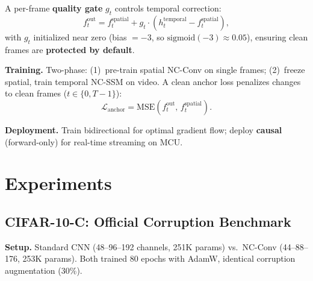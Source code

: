 \documentclass[runningheads]{llncs}
\begin{document}
A per-frame \textbf{quality gate} $g_t$ controls temporal correction:
\begin{equation}
f_t^{\text{out}} = f_t^{\text{spatial}} + g_t \cdot (h_t^{\text{temporal}} - f_t^{\text{spatial}}),
\end{equation}
with $g_t$ initialized near zero (bias $= -3$, so $\text{sigmoid}(-3) \approx 0.05$), ensuring clean frames are \textbf{protected by default}.

\noindent\textbf{Training.}
Two-phase: (1)~pre-train spatial NC-Conv on single frames; (2)~freeze spatial, train temporal NC-SSM on video.
A clean anchor loss penalizes changes to clean frames ($t \in \{0, T{-}1\}$):
\begin{equation}
\mathcal{L}_{\text{anchor}} = \text{MSE}(f_t^{\text{out}},\, f_t^{\text{spatial}}).
\end{equation}

\noindent\textbf{Deployment.}
Train bidirectional for optimal gradient flow; deploy \textbf{causal} (forward-only) for real-time streaming on MCU.


\section{Experiments}
\label{sec:experiments}

\subsection{CIFAR-10-C: Official Corruption Benchmark}
\label{sec:cifar10c}

\noindent\textbf{Setup.}
Standard CNN (48--96--192 channels, 251K params) vs.\ NC-Conv (44--88--176, 253K params).
Both trained 80 epochs with AdamW, identical corruption augmentation (30\%).
\end{document}
